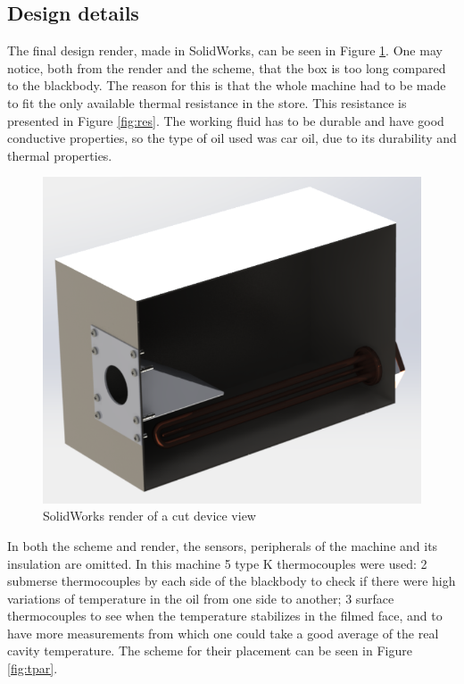 \subsection{Design details}
\par The final design render, made in SolidWorks, can be seen in Figure \ref{fig:render}. One may notice, both from the render and the scheme, that the box is too long compared to the blackbody. The reason for this is that the whole machine had to be made to fit the only available thermal resistance in the store. This resistance is presented in Figure \ref{fig:res}. The working fluid has to be durable and have good conductive properties, so the type of oil used was car oil, due to its durability and thermal properties. \\

\begin{figure}[h]
\centering
\includegraphics[width=0.8\linewidth]{Figures/4.Chapter/caixa_render.PNG}
\caption{SolidWorks render of a cut device view}
\label{fig:render}
\end{figure}

\par In both the scheme and render, the sensors, peripherals of the machine and its insulation are omitted. In this machine 5 type K thermocouples were used: 2 submerse thermocouples by each side of the blackbody to check if there were high variations of temperature in the oil from one side to another; 3 surface thermocouples to see when the temperature stabilizes in the filmed face, and to have more measurements from which one could take a good average of the real cavity temperature. The scheme for their placement can be seen in Figure \ref{fig:tpar}. \\

